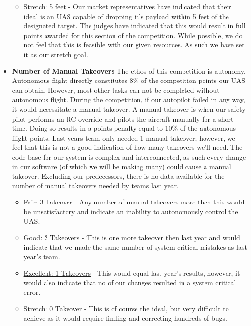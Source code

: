 \documentclass[]{auvsi_doc}
\begin{document}
\begin{itemize}
\begin{itemize}
	\item \underline{Stretch: 5 feet} -  Our market representatives have indicated that their ideal is an UAS capable of dropping it's payload within 5 feet of the designated target. The judges have indicated that this would result in full points awarded for this section of the competition. While possible, we do not feel that this is feasible with our given resources. As such we have set it as our stretch goal.
	\end{itemize}
\item \textbf{Number of Manual Takeovers} The ethos of this competition is autonomy. Autonomous flight directly constitutes 8\% of the competition points our UAS can obtain. However, most other tasks can not be completed without autonomous flight. During the competition, if our autopilot failed in any way, it would necessitate a manual takeover. A manual takeover is when our safety pilot performs an RC override and pilots the aircraft manually for a short time. Doing so results in a points penalty equal to 10\% of the autonomous flight points. Last years team only needed 1 manual takeover; however, we feel that this is not a good indication of how many takeovers we'll need. The code base for our system is complex and interconnected, as such every change in our software (of which we will be making many) could cause a manual takeover. Excluding our predecessors, there is no data available for the number of manual takeovers needed by teams last year.
	\begin{itemize}
	\item  \underline{Fair: 3 Takeover} -  Any number of manual takeovers more then this would be unsatisfactory and indicate an inability to autonomously control the UAS.
	\item \underline{Good: 2 Takeovers} -  This is one more takeover then last year and would indicate that we made the same number of system critical mistakes as last year's team. 
	\item \underline{Excellent: 1 Takeovers} -  This would equal last year's results, however, it would also indicate that no of our changes resulted in a system critical error.
	\item \underline{Stretch: 0 Takeover} - This is of course the ideal, but very difficult to achieve as it would require finding and correcting hundreds of bugs.
	\end{itemize}
\end{itemize}
\end{document}
